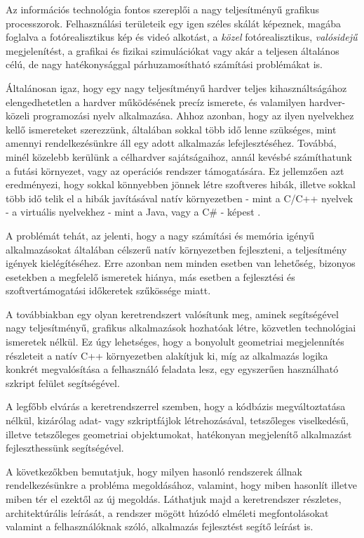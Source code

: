 
Az információs technológia fontos szereplői a nagy teljesítményű grafikus processzorok. Felhasználási területeik egy igen széles skálát képeznek, magába foglalva a fotórealisztikus kép és videó alkotást, a \textit{közel} fotórealisztikus, \textit{valósidejű} megjelenítést, a grafikai és fizikai szimulációkat vagy akár a teljesen általános célú, de nagy hatékonysággal párhuzamosítható számítási problémákat is. 

Általánosan igaz, hogy egy nagy teljesítményű hardver teljes kihasználtságához elengedhetetlen a hardver működésének precíz ismerete, és valamilyen hardver-közeli programozási nyelv alkalmazása. Ahhoz azonban, hogy az ilyen nyelvekhez kellő ismereteket szerezzünk, általában sokkal több idő lenne szükséges, mint amennyi rendelkezésünkre áll egy adott alkalmazás lefejlesztéséhez. Továbbá, minél közelebb kerülünk a célhardver sajátságaihoz, annál kevésbé számíthatunk a futási környezet, vagy az operációs rendszer támogatására. Ez jellemzően azt eredményezi, hogy sokkal könnyebben jönnek létre szoftveres hibák, illetve sokkal több idő telik el a hibák javításával natív környezetben - mint a C/C++ nyelvek - a virtuális nyelvekhez - mint a Java, vagy a C\# - képest \cite{morebugsincpp}.

A problémát tehát, az jelenti, hogy a nagy számítási és memória igényű alkalmazásokat általában célszerű natív környezetben fejleszteni, a teljesítmény igények kielégítéséhez. Erre azonban nem minden esetben van lehetőség, bizonyos esetekben a megfelelő ismeretek hiánya, más esetben a fejlesztési és szoftvertámogatási időkeretek szűkössége miatt.

A továbbiakban egy olyan keretrendszert valósítunk meg, aminek segítségével nagy teljesítményű, grafikus alkalmazások hozhatóak létre, közvetlen technológiai ismeretek nélkül. Ez úgy lehetséges, hogy a bonyolult geometriai megjelennítés részleteit a natív C++ környezetben alakítjuk ki, míg az alkalmazás logika konkrét megvalósítása a felhasználó feladata lesz, egy egyszerűen használható szkript felület segítségével.

A legfőbb elvárás a keretrendszerrel szemben, hogy a kódbázis megváltoztatása nélkül, kizárólag adat- vagy szkriptfájlok létrehozásával, tetszőleges viselkedésű, illetve tetszőleges geometriai objektumokat, hatékonyan megjelenítő alkalmazást fejleszthessünk segítségével.

A következőkben bemutatjuk, hogy milyen hasonló rendszerek állnak rendelkezésünkre a probléma megoldásához, valamint, hogy miben hasonlít illetve miben tér el ezektől az új megoldás. Láthatjuk majd a keretrendszer részletes, architektúrális leírását, a rendszer mögött húzódó elméleti megfontolásokat valamint a felhasználóknak szóló, alkalmazás fejlesztést segítő leírást is.
